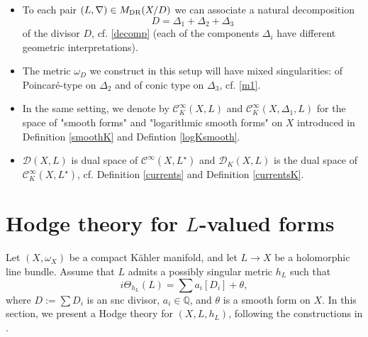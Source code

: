 \documentclass[english]{amsart}
\newcommand{\cC}{\mathcal{C}}
\numberwithin{equation}{thm}
\begin{document}
\begin{itemize}
	\item To each pair \( (L, \nabla)  \in M_{\rm DR}(X/D) \) we can associate a natural decomposition $$D=\Delta_1 +\Delta_2 +\Delta_3$$ of 
	the divisor $D$, cf. \eqref{decomp} (each of the components $\Delta_i$ have different geometric interpretations).
	
	\item The metric $\omega_D$ we construct in this setup will have mixed singularities: of Poincaré-type on $\Delta_2$ and of
	conic type on $\Delta_3$, cf. \eqref{m1}.
	
	\item  In the same setting, we denote by 
	\(\cC^\infty_{K}(X,L)\) and \(\cC^\infty_{K}(X,\Delta_1,L)\) for the space of "smooth forms" and "logarithmic smooth forms" on \(X\) introduced in Definition \ref{smoothK} and Defintion \ref{logKsmooth}. 
	
	\item $\mathcal{D} (X,L)$ is dual space of $\cC^\infty (X, L^\star)$ and \(\mathcal{D}_{K}(X,L)\) is the dual space of 	\(\cC^\infty_{K}(X,L^\star)\), cf. Definition \ref{currents} and Definition \ref{currentsK}.  

\end{itemize}

	
\section{Hodge theory for $L$-valued forms}\label{conicsection}

Let $(X,\omega_X)$ be a compact K\"ahler manifold, and let $L\to X$ be a holomorphic line bundle. Assume that $L$ admits a possibly singular metric $h_L$ such that
\begin{equation}\label{singmetr}
	i\Theta_{h_L}(L)=\sum a_i [D_i]+\theta,
\end{equation}
where $D:=\sum D_i$ is an snc divisor, $a_i\in \mathbb Q$, and $\theta$ is a smooth form on $X$.
In this section, we present a Hodge theory for $(X,L,h_L)$, following the constructions in \cite{JCMP}.
\end{document}
